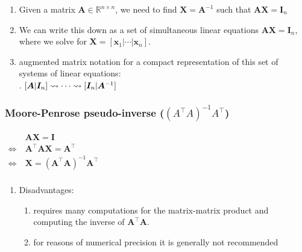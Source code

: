 \begin{enumerate}
    \item Given a matrix $\bm{A} \in \mathbb{R}^{n\times n}$, we need to find $\bm{X} = \bm{A}^{-1}$ such that $\bm{A}\bm{X} = \bm{I}_n$
    \hfill \cite{mfml/book/mml/Deisenroth-Faisal-Ong}
    
    \item We can write this down as a set of simultaneous linear equations $\bm{A}\bm{X} = \bm{I}_n$, where we solve for $\bm{X} = [\bm{x}_1| \cdots |\bm{x}_n]$. 
    \hfill \cite{mfml/book/mml/Deisenroth-Faisal-Ong}

    \item augmented matrix notation for a compact representation of this set of systems of linear equations:
    \hfill \cite{mfml/book/mml/Deisenroth-Faisal-Ong}
    \\
    .\hfill
    $
        [\bm{A}|\bm{I}_n] 
        \mathrel{\leadsto} \cdots \mathrel{\leadsto} 
        [\bm{I}_n|\bm{A}^{-1}]
    $
    \hfill \cite{mfml/book/mml/Deisenroth-Faisal-Ong}

    
\end{enumerate}




\subsubsection{Moore-Penrose pseudo-inverse ($({A}^\top {A})^{-1} {A}^\top$)}

$
    \begin{aligned}
                         & \bm{A}\bm{X} = \bm{I} \\
        \Leftrightarrow\ & \bm{A}^\top \bm{A}\bm{X} = \bm{A}^\top \\
        \Leftrightarrow\ & \bm{X} = (\bm{A}^\top \bm{A})^{-1} \bm{A}^\top \\
    \end{aligned}
$
\hfill \cite{mfml/book/mml/Deisenroth-Faisal-Ong}


\vspace{0.2cm}

\begin{enumerate}
    \item Disadvantages:
    \begin{enumerate}
        \item requires many computations for the matrix-matrix product and computing the inverse of $\bm{A}^\top \bm{A}$. 
        \hfill \cite{mfml/book/mml/Deisenroth-Faisal-Ong}

        \item for reasons of numerical precision it is generally not recommended
        \hfill \cite{mfml/book/mml/Deisenroth-Faisal-Ong}
    \end{enumerate}
\end{enumerate}





